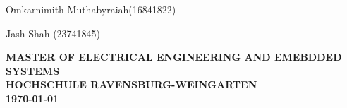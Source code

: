 \documentclass[12pt]{report}
\begin{document}
\begin{titlepage}
\hspace{47mm} \Large Omkarnimith Muthabyraiah(16841822)
\par
\hspace{65mm} \Large Jash Shah (23741845)

\vspace{5mm}
\begin{center}

\textbf{\Large MASTER OF ELECTRICAL ENGINEERING AND EMEBDDED SYSTEMS}\\[0.4cm]
\vspace{5mm}
\textbf{\Large HOCHSCHULE RAVENSBURG-WEINGARTEN}\\[0.4cm]
\vspace{5mm}
\textbf{\Large \today}
\end{center}
 \end{titlepage}


	
	
	\tableofcontents 
 \newpage
	\listoffigures
	\listoftables


 



 


\end{document}
